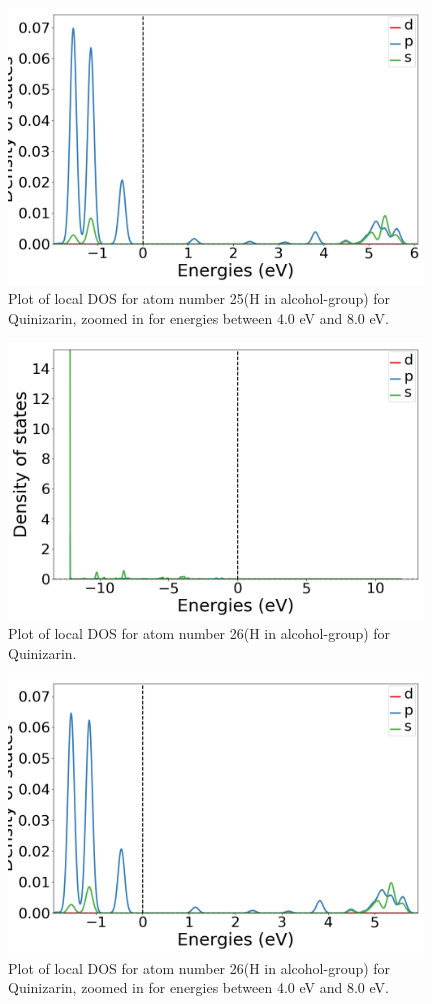 \documentclass{article}
\begin{document}
  \begin{figure}[H]
      \centering
      \includegraphics[width = 11cm]{../fig/basic_LDOS25_2.png}
      \caption{Plot of local DOS for atom number 25(H in alcohol-group) for Quinizarin, zoomed in for energies between 4.0 eV and 8.0 eV. }
      \label{fig:basic_LDOS25_2}
  \end{figure}

  \begin{figure}[H]
      \centering
      \includegraphics[width = 11cm]{../fig/basic_LDOS26_1.png}
      \caption{Plot of local DOS for atom number 26(H in alcohol-group) for Quinizarin. }
      \label{fig:basic_LDOS26_1}
  \end{figure}

  \begin{figure}[H]
      \centering
      \includegraphics[width = 11cm]{../fig/basic_LDOS26_2.png}
      \caption{Plot of local DOS for atom number 26(H in alcohol-group) for Quinizarin, zoomed in for energies between 4.0 eV and 8.0 eV. }
      \label{fig:basic_LDOS26_2}
  \end{figure}
\end{document}
